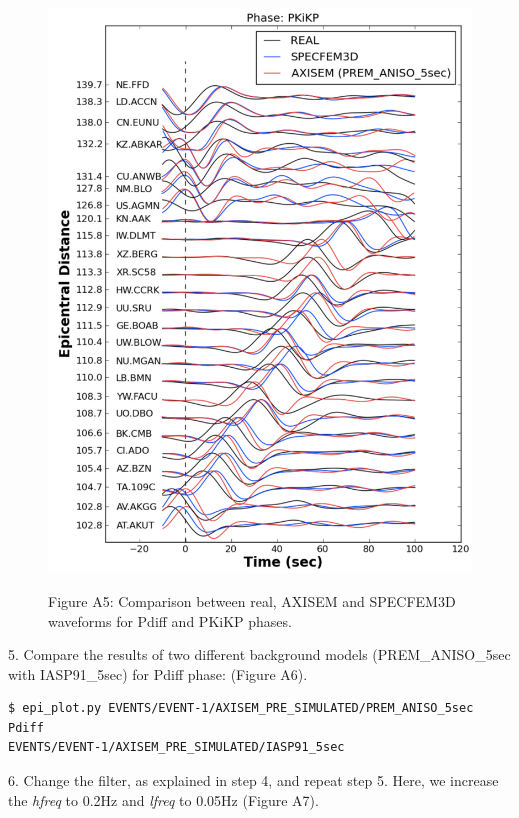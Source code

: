 \documentclass{article}
\begin{document}
\begin{figure}
\begin{minipage}{.5\textwidth}
  \includegraphics[width=1.\linewidth]{AXISEMTutorial-fig011.pdf}
\end{minipage}
\begin{center}
{\small{}Figure A5: Comparison between real, AXISEM and SPECFEM3D waveforms for 
Pdiff and PKiKP phases.}
\end{center}
\end{figure}

5. Compare the results of two different background models (PREM\_ANISO\_5sec with 
IASP91\_5sec) for Pdiff phase: (Figure A6).

\begin{lstlisting}
$ epi_plot.py EVENTS/EVENT-1/AXISEM_PRE_SIMULATED/PREM_ANISO_5sec Pdiff 
EVENTS/EVENT-1/AXISEM_PRE_SIMULATED/IASP91_5sec
\end{lstlisting}

6. Change the filter, as explained in step 4, and repeat step 5. Here, we increase 
the \textit{hfreq} to 0.2Hz and \textit{lfreq} to 0.05Hz (Figure A7).
\end{document}
